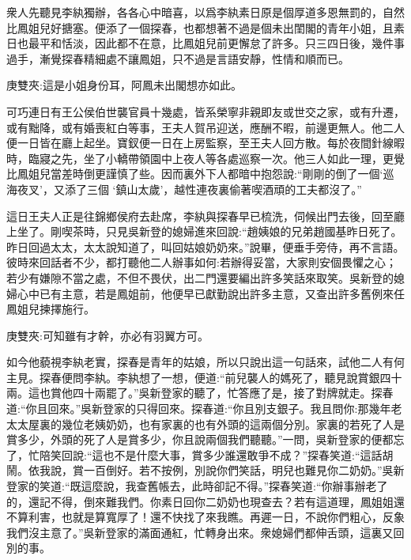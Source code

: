 \begin{parag}
    衆人先聽見李紈獨辦，各各心中暗喜，以爲李紈素日原是個厚道多恩無罰的，自然比鳳姐兒好搪塞。便添了一個探春，也都想著不過是個未出閨閣的青年小姐，且素日也最平和恬淡，因此都不在意，比鳳姐兒前更懈怠了許多。只三四日後，幾件事過手，漸覺探春精細處不讓鳳姐，只不過是言語安靜，性情和順而已。\begin{note}庚雙夾:這是小姐身份耳，阿鳳未出閣想亦如此。\end{note}可巧連日有王公侯伯世襲官員十幾處，皆系榮寧非親即友或世交之家，或有升遷，或有黜降，或有婚喪紅白等事，王夫人賀吊迎送，應酬不暇，前邊更無人。他二人便一日皆在廳上起坐。寶釵便一日在上房監察，至王夫人回方散。每於夜間針線暇時，臨寢之先，坐了小轎帶領園中上夜人等各處巡察一次。他三人如此一理，更覺比鳳姐兒當差時倒更謹慎了些。因而裏外下人都暗中抱怨說:“剛剛的倒了一個‘巡海夜叉’，又添了三個 ‘鎮山太歲’，越性連夜裏偷著喫酒頑的工夫都沒了。”
\end{parag}


\begin{parag}
    這日王夫人正是往錦鄉侯府去赴席，李紈與探春早已梳洗，伺候出門去後，回至廳上坐了。剛喫茶時，只見吳新登的媳婦進來回說:“趙姨娘的兄弟趙國基昨日死了。昨日回過太太，太太說知道了，叫回姑娘奶奶來。”說畢，便垂手旁侍，再不言語。彼時來回話者不少，都打聽他二人辦事如何:若辦得妥當，大家則安個畏懼之心；若少有嫌隙不當之處，不但不畏伏，出二門還要編出許多笑話來取笑。吳新登的媳婦心中已有主意，若是鳳姐前，他便早已獻勤說出許多主意，又查出許多舊例來任鳳姐兒揀擇施行。\begin{note}庚雙夾:可知雖有才幹，亦必有羽翼方可。\end{note}如今他藐視李紈老實，探春是青年的姑娘，所以只說出這一句話來，試他二人有何主見。探春便問李紈。李紈想了一想，便道:“前兒襲人的媽死了，聽見說賞銀四十兩。這也賞他四十兩罷了。”吳新登家的聽了，忙答應了是，接了對牌就走。探春道:“你且回來。”吳新登家的只得回來。探春道:“你且別支銀子。我且問你:那幾年老太太屋裏的幾位老姨奶奶，也有家裏的也有外頭的這兩個分別。家裏的若死了人是賞多少，外頭的死了人是賞多少，你且說兩個我們聽聽。”一問，吳新登家的便都忘了，忙陪笑回說:“這也不是什麼大事，賞多少誰還敢爭不成？”探春笑道:“這話胡鬧。依我說，賞一百倒好。若不按例，別說你們笑話，明兒也難見你二奶奶。”吳新登家的笑道:“既這麼說，我查舊帳去，此時卻記不得。”探春笑道:“你辦事辦老了的，還記不得，倒來難我們。你素日回你二奶奶也現查去？若有這道理，鳳姐姐還不算利害，也就是算寬厚了！還不快找了來我瞧。再遲一日，不說你們粗心，反象我們沒主意了。”吳新登家的滿面通紅，忙轉身出來。衆媳婦們都伸舌頭，這裏又回別的事。
\end{parag}


